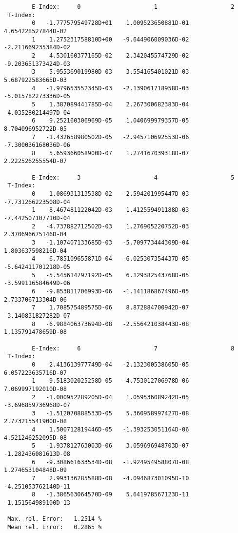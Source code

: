 \documentclass[12pt]{article}
\begin{document}
\begin{small}\begin{verbatim}
        E-Index:     0                     1                     2
 T-Index:
        0   -1.777579549728D+01    1.009523650881D-01    4.654228527844D-02
        1    1.275231758810D+00   -9.644906009036D-02   -2.211669235384D-02
        2    4.530160377165D-02    2.342045574729D-02   -9.203651373424D-03
        3   -5.955369019980D-03    3.554165401021D-03    5.687922583665D-03
        4   -1.979653552345D-03   -2.139061718958D-03   -5.015782273336D-05
        5    1.387089441785D-04    2.267300682383D-04   -4.035280214497D-04
        6    9.252160306969D-05    1.040699979357D-05    8.704096952722D-05
        7   -1.432658980502D-05   -2.945710692553D-06   -7.300036168036D-06
        8    5.659366058900D-07    1.274167039318D-07    2.222526255554D-07

        E-Index:     3                     4                     5
 T-Index:
        0    1.086931313538D-02   -2.594201995447D-03   -7.731266223508D-04
        1    8.467481122042D-03    1.412559491188D-03   -7.442507107710D-04
        2   -4.737882712502D-03    1.276905220752D-03    2.370696675146D-04
        3   -1.107407133685D-03   -5.709773444309D-04    1.803637598216D-04
        4    6.785109655871D-04   -6.025307354437D-05   -5.642411701218D-05
        5   -5.545614797192D-05    6.129382543768D-05   -3.599116584649D-06
        6   -9.853811706993D-06   -1.141186867496D-05    2.733706713304D-06
        7    1.708575489575D-06    8.872884700942D-07   -3.140831827282D-07
        8   -6.988406373694D-08   -2.556421038443D-08    1.135791478659D-08

        E-Index:     6                     7                     8
 T-Index:
        0    2.413613977749D-04   -2.132300538605D-05    6.057223635716D-07
        1    9.518302025258D-05   -4.753012706978D-06    7.069997192010D-08
        2   -1.000952289205D-04    1.059536089242D-05   -3.696859736968D-07
        3   -1.512070888533D-05    5.360958997427D-08    2.773215541900D-08
        4    1.500712819446D-05   -1.393253051164D-06    4.521246252095D-08
        5   -1.937812763003D-06    3.059696948703D-07   -1.282436081613D-08
        6   -9.308661633534D-08   -1.924954958807D-08    1.274653104848D-09
        7    2.993136285588D-08   -4.094687301095D-10   -4.251053762140D-11
        8   -1.386563064570D-09    5.641978567123D-11   -1.151564989100D-13

 Max. rel. Error:   1.2514 %
 Mean rel. Error:   0.2865 %
\end{verbatim}\end{small}
\end{document}
